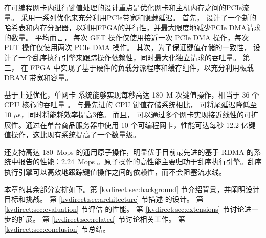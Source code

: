 在可编程网卡内进行键值处理的设计重点是优化网卡和主机内存之间的PCIe流量。
\oursys{} 采用一系列优化来充分利用PCIe带宽和隐藏延迟。
首先，\oursys{} 设计了一个新的哈希表和内存分配器，以利用FPGA的并行性，并最大限度地减少PCIe DMA请求的数量。
平均而言，\oursys{} 每次 GET 操作仅使用接近一次 PCIe DMA 操作，每次 PUT 操作仅使用两次 PCIe DMA 操作。
其次，为了保证键值存储的一致性，\oursys{} 设计了一个乱序执行引擎来跟踪操作依赖性，同时最大化独立请求的吞吐量。
第三，\oursys{} 在 FPGA 中实现了基于硬件的负载分派程序和缓存组件，以充分利用板载 DRAM 带宽和容量。

基于上述优化，单网卡 \oursys{} 系统能够实现每秒高达 180~M 次键值操作，相当于 36 个 CPU 核心的吞吐量 \cite {li2016full}。
与最先进的 CPU 键值存储系统相比，\oursys{} 可将尾延迟降低至 10 $\mu$s，同时将能耗效率提高3倍。
而且，\oursys{} 可以通过多个网卡实现接近线性的可扩展性。通过在单台商品服务器中使用 10 个可编程网卡，性能可达每秒 12.2 亿键值操作，这比现有系统提高了一个数量级。

\oursys{} 还支持高达 180~Mops 的通用原子操作，明显优于目前最先进的基于 RDMA 的系统中报告的性能：2.24~Mops \cite {kalia2014using}。原子操作的高性能主要归功于乱序执行引擎。乱序执行引擎可以高效地跟踪键值操作之间的依赖性，而不会阻塞流水线。

本章的其余部分安排如下。第 \ref {kvdirect:sec:background} 节介绍背景，并阐明设计目标和挑战。
第 \ref {kvdirect:sec:architecture} 节描述 \oursys{} 的设计。
第 \ref {kvdirect:sec:evaluation} 节评估 \oursys{} 的性能。
第 \ref {kvdirect:sec:extensions} 节讨论进一步的扩展。
第 \ref {kvdirect:sec:related} 节讨论相关工作。
第 \ref {kvdirect:sec:conclusion} 节总结。
